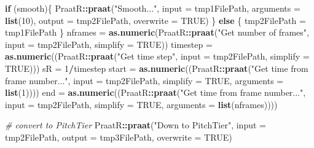 \documentclass[]{book}
\newenvironment{Shaded}{\begin{snugshade}}{\end{snugshade}}
\newcommand{\CommentTok}[1]{\textcolor[rgb]{0.56,0.35,0.01}{\textit{#1}}}
\newcommand{\ControlFlowTok}[1]{\textcolor[rgb]{0.13,0.29,0.53}{\textbf{#1}}}
\newcommand{\DataTypeTok}[1]{\textcolor[rgb]{0.13,0.29,0.53}{#1}}
\newcommand{\DecValTok}[1]{\textcolor[rgb]{0.00,0.00,0.81}{#1}}
\newcommand{\KeywordTok}[1]{\textcolor[rgb]{0.13,0.29,0.53}{\textbf{#1}}}
\newcommand{\NormalTok}[1]{#1}
\newcommand{\OperatorTok}[1]{\textcolor[rgb]{0.81,0.36,0.00}{\textbf{#1}}}
\newcommand{\OtherTok}[1]{\textcolor[rgb]{0.56,0.35,0.01}{#1}}
\newcommand{\StringTok}[1]{\textcolor[rgb]{0.31,0.60,0.02}{#1}}
\begin{document}
\begin{Shaded}
\begin{Highlighting}[]
  \ControlFlowTok{if}\NormalTok{ (smooth)\{}
\NormalTok{    PraatR}\OperatorTok{::}\KeywordTok{praat}\NormalTok{(}\StringTok{"Smooth..."}\NormalTok{,}
                  \DataTypeTok{input =}\NormalTok{ tmp1FilePath,}
                  \DataTypeTok{arguments =} \KeywordTok{list}\NormalTok{(}\DecValTok{10}\NormalTok{),}
                  \DataTypeTok{output =}\NormalTok{ tmp2FilePath,}
                  \DataTypeTok{overwrite =} \OtherTok{TRUE}\NormalTok{)}
\NormalTok{  \} }\ControlFlowTok{else}\NormalTok{ \{}
\NormalTok{    tmp2FilePath =}\StringTok{ }\NormalTok{tmp1FilePath}
\NormalTok{  \}}
\NormalTok{  nframes =}\StringTok{ }\KeywordTok{as.numeric}\NormalTok{(PraatR}\OperatorTok{::}\KeywordTok{praat}\NormalTok{(}\StringTok{"Get number of frames"}\NormalTok{,}
                                     \DataTypeTok{input =}\NormalTok{ tmp2FilePath,}
                                     \DataTypeTok{simplify =} \OtherTok{TRUE}\NormalTok{))}
\NormalTok{  timestep =}\StringTok{ }\KeywordTok{as.numeric}\NormalTok{((PraatR}\OperatorTok{::}\KeywordTok{praat}\NormalTok{(}\StringTok{"Get time step"}\NormalTok{,}
                                       \DataTypeTok{input =}\NormalTok{ tmp2FilePath,}
                                       \DataTypeTok{simplify =} \OtherTok{TRUE}\NormalTok{)))}
\NormalTok{  sR =}\StringTok{ }\DecValTok{1}\OperatorTok{/}\NormalTok{timestep}
\NormalTok{  start =}\StringTok{ }\KeywordTok{as.numeric}\NormalTok{((PraatR}\OperatorTok{::}\KeywordTok{praat}\NormalTok{(}\StringTok{"Get time from frame number..."}\NormalTok{,}
                                    \DataTypeTok{input =}\NormalTok{ tmp2FilePath,}
                                    \DataTypeTok{simplify =} \OtherTok{TRUE}\NormalTok{,}
                                    \DataTypeTok{arguments =} \KeywordTok{list}\NormalTok{(}\DecValTok{1}\NormalTok{))))}
\NormalTok{  end =}\StringTok{ }\KeywordTok{as.numeric}\NormalTok{((PraatR}\OperatorTok{::}\KeywordTok{praat}\NormalTok{(}\StringTok{"Get time from frame number..."}\NormalTok{,}
                                  \DataTypeTok{input =}\NormalTok{ tmp2FilePath,}
                                  \DataTypeTok{simplify =} \OtherTok{TRUE}\NormalTok{,}
                                  \DataTypeTok{arguments =} \KeywordTok{list}\NormalTok{(nframes))))}



  \CommentTok{# convert to PitchTier}
\NormalTok{  PraatR}\OperatorTok{::}\KeywordTok{praat}\NormalTok{(}\StringTok{"Down to PitchTier"}\NormalTok{,}
                \DataTypeTok{input =}\NormalTok{ tmp2FilePath,}
                \DataTypeTok{output =}\NormalTok{ tmp3FilePath,}
                \DataTypeTok{overwrite =} \OtherTok{TRUE}\NormalTok{)}


\end{Highlighting}
\end{Shaded}
\end{document}
